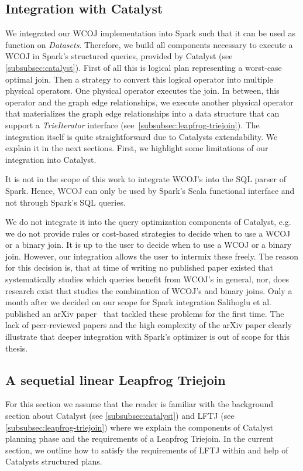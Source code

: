 \subsection{Integration with Catalyst} \label{ssec:integration-with-catalyst}


We integrated our WCOJ implementation into Spark such that it can be used as function on \textit{Datasets}.
Therefore, we build all components necessary to execute a WCOJ in Spark's structured queries, provided by Catalyst (see
\cref{subsubsec:catalyst}).
First of all this is logical plan representing a worst-case optimal join.
Then a strategy to convert this logical operator into multiple physical operators.
One physical operator executes the join.
In between, this operator and the graph edge relationships, we execute another physical operator that materializes
the graph edge relationships into a data structure that can support a \textit{TrieIterator} interface
(see~\cref{subsubsec:leapfrog-triejoin}).
The integration itself is quite straightforward due to Catalysts extendability.
We explain it in the next sections.
First, we highlight some limitations of our integration into Catalyst.

It is not in the scope of this work to integrate WCOJ's into the SQL parser of Spark.
Hence, WCOJ can only be used by Spark's Scala functional interface and not through Spark's SQL queries.

We do not integrate it into the query optimization components of Catalyst, e.g. we do not provide rules or cost-based strategies to
decide when to use a WCOJ or a binary join.
It is up to the user to decide when to use a WCOJ or a binary join.
However, our integration allows the user to intermix these freely.
The reason for this decision is, that at time of writing no published paper existed that systematically studies which queries benefit from
WCOJ's in general, nor, does research exist that studies the combination of WCOJ's and binary joins.
Only a month after we decided on our scope for Spark integration Salihoglu et al. published an arXiv paper~\cite{mhedhbi2019} that
tackled these problems for the first time.
The lack of peer-reviewed papers and the high complexity of the arXiv paper clearly illustrate that deeper integration with
Spark's optimizer is out of scope for this thesis.


\subsection{A sequetial linear Leapfrog Triejoin} \label{subsec:spark-integration-seq}
For this section we assume that the reader is familiar with the background section about Catalyst (see \cref{subsubsec:catalyst}) and
\textsc{LFTJ} (see \cref{subsubsec:leapfrog-triejoin}) where we explain the components of Catalyst planning phase and the requirements
of a Leapfrog Triejoin.
In the current section, we outline how to satisfy the requirements of \textsc{LFTJ} within and help of Catalysts structured plans.

